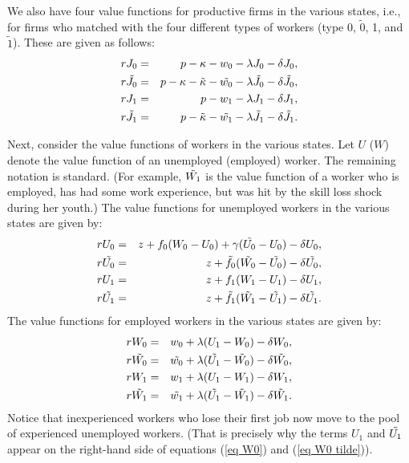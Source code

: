 \documentclass[12pt]{article} %
\theoremstyle{definition}
\begin{document}
We also have four value functions for productive firms in the various states, i.e., for firms who matched with the four different types of workers (type 0, $\tilde{0}$, 1, and $\tilde{1}$). These are given as follows:   
\begin{eqnarray}
    rJ_0 &=&p-\kappa-w_0-\lambda J_0 - \delta J_0,\label{eq J0} \\
    r\Tilde{J_0} &=&p-\kappa-\Tilde{\kappa}-\Tilde{w_0}-\lambda \Tilde{J_0} - \delta \Tilde{J_0},\label{eq J0 tilde}\\
    rJ_1 &=&p-w_1-\lambda J_1 - \delta J_1, \label{eq J1} \\
        r\Tilde{J_1} &=&p-\Tilde{\kappa}-\Tilde{w_1}-\lambda \Tilde{J_1} - \delta \Tilde{J_1} . \label{eq J1 tilde}
    \end{eqnarray}

Next, consider the value functions of workers in the various states. Let $U$ ($W$) denote the value function of an unemployed (employed) worker. The remaining notation is standard. (For example, $\Tilde{W_1}$ is the value function of a worker who is employed, has had some work experience, but was hit by the skill loss shock during her youth.) The value functions for unemployed workers in the various states are given by: 
\begin{eqnarray}
    rU_0 &=& z+f_0(W_0-U_0)+\gamma(\Tilde{U_0}-U_0) - \delta U_0, \label{eq U0} \\
    r\Tilde{U_0} &=& z+\Tilde{f_0}(\Tilde{W_0}-\Tilde{U_0})- \delta \Tilde{U_0}, \label{eq U0 tilde}\\
    rU_1 &=& z+f_1(W_1-U_1)- \delta U_1, \label{eq U1}\\
    r\Tilde{U_1} &=& z+\Tilde{f_1}(\Tilde{W_1}-\Tilde{U_1})- \delta \Tilde{U_1}. \label{eq U1 tilde} 
\end{eqnarray}
The value functions for employed workers in the various states are given by: 
\begin{eqnarray}
    rW_0 &=&w_0+\lambda(U_1-W_0)- \delta W_0, \label{eq W0} \\
     r\Tilde{W_0} &=& \Tilde{w_0}+\lambda(\Tilde{U_1}-\Tilde{W_0})- \delta \Tilde{W_0}, \label{eq W0 tilde} \\
     rW_1 &=& w_1+\lambda(U_1-W_1)- \delta W_1, \label{eq W1} \\
     r\Tilde{W_1} &=& \Tilde{w_1}+\lambda(\Tilde{U_1}-\Tilde{W_1})- \delta \Tilde{W_1}. \label{eq W1 tilde}
     \end{eqnarray}
Notice that inexperienced workers who lose their first job now move to the pool of experienced unemployed workers. (That is precisely why the terms $U_1$ and $\Tilde{U_1}$ appear on the right-hand side of equations (\ref{eq W0}) and (\ref{eq W0 tilde})).  
\end{document}
